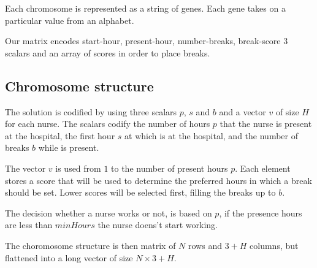 \documentclass[12pt,a4paper]{article}
\begin{document}
Each chromosome is represented as a string of genes. Each gene takes on a 
particular value from an alphabet.

Our matrix encodes start-hour, present-hour, number-breaks, break-score
3 scalars and an array of scores in order to place breaks.


\subsection{Chromosome structure}

The solution is codified by using three scalars $p$, $s$ and $b$ and a vector 
$v$ of size $H$ for each nurse. The scalars codify the number of hours $p$ that 
the nurse is present at the hospital, the first hour $s$ at which is at the 
hospital, and the number of breaks $b$ while is present.

The vector $v$ is used from $1$ to the number of present hours $p$. Each element 
stores a score that will be used to determine the preferred hours in which a 
break should be set. Lower scores will be selected first, filling the breaks up 
to $b$.

The decision whether a nurse works or not, is based on $p$, if the presence 
hours are less than $minHours$ the nurse doens't start working.

The choromosome structure is then matrix of $N$ rows and $3+H$ columns, but 
flattened into a long vector of size $N \times 3+H$.
\end{document}
